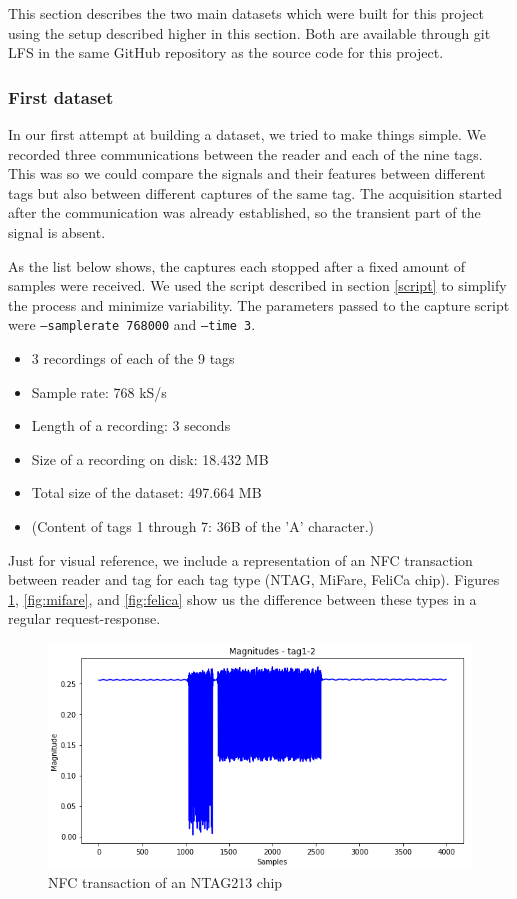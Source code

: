 This section describes the two main datasets which were built for this project using the setup described higher in this section. Both are available through git LFS in the same GitHub repository as the source code for this project.

\subsubsection{First dataset}

In our first attempt at building a dataset, we tried to make things simple. We recorded three communications between the reader and each of the nine tags. This was so we could compare the signals and their features between different tags but also between different captures of the same tag. The acquisition started after the communication was already established, so the transient part of the signal is absent.

As the list below shows, the captures each stopped after a fixed amount of samples were received. We used the script described in section \ref{script} to simplify the process and minimize variability. The parameters passed to the capture script were \texttt{--samplerate 768000} and \texttt{--time 3}.

\begin{itemize}
  \item 3 recordings of each of the 9 tags
  \item Sample rate: 768 kS/s
  \item Length of a recording: 3 seconds
  \item Size of a recording on disk: 18.432 MB
  \item Total size of the dataset: 497.664 MB
  \item (Content of tags 1 through 7: 36B of the 'A' character.)
\end{itemize}

Just for visual reference, we include a representation of an NFC transaction between reader and tag for each tag type (NTAG, MiFare, FeliCa chip). Figures \ref{fig:ntag}, \ref{fig:mifare}, and \ref{fig:felica} show us the difference between these types in a regular request-response.

\begin{figure}[htbp!]
  \centering
  \includegraphics[scale=0.65]{figures/data_magnitudes_NTAG.png}
  \caption{NFC transaction of an NTAG213 chip}
  \label{fig:ntag}
\end{figure}

